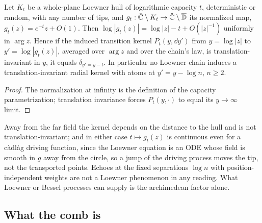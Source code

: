 \begin{proposition}\label{prop:farfield}
Let $K_t$ be a whole-plane Loewner hull of logarithmic capacity $t$,
deterministic or random, with any number of tips, and
$g_t:\hat{\mathbb C}\setminus K_t\to\hat{\mathbb C}\setminus\overline{\mathbb D}$ its normalized
map, $g_t(z)=e^{-t}z+O(1)$. Then $\log|g_t(z)|=\log|z|-t+O(|z|^{-1})$ uniformly
in $\arg z$. Hence if the induced transition kernel $P_t(y,\dd y')$ from
$y=\log|z|$ to $y'=\log|g_t(z)|$, averaged over $\arg z$ and over the chain's
law, is translation-invariant in $y$, it equals $\delta_{y'=y-t}$. In
particular no Loewner chain induces a translation-invariant radial kernel with
atoms at $y'=y-\log n$, $n\geq2$.
\end{proposition}
\begin{proof}
The normalization at infinity is the definition of the capacity
parametrization; translation invariance forces $P_t(y,\cdot)$ to equal its
$y\to\infty$ limit.
\end{proof}

Away from the far field the kernel depends on the distance to the hull and is
not translation-invariant; and in either case $t\mapsto g_t(z)$ is continuous
even for a c\`adl\`ag driving function, since the Loewner equation is an ODE
whose field is smooth in $g$ away from the circle, so a jump of the driving
process moves the tip, not the transported points. Echoes at the fixed
separations $\log n$ with position-independent weights are not a Loewner
phenomenon in any reading. What Loewner or Bessel processes can supply is the
archimedean factor alone.

\subsection{What the comb is}\label{sec:hecke}

